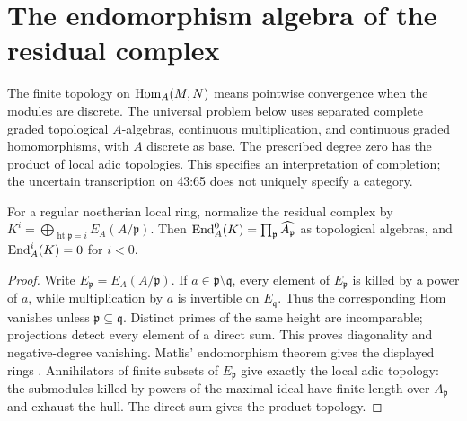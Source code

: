 \section{The endomorphism algebra of the residual complex}\label{sec:I}
The finite topology on $\operatorname{Hom}_A(M,N)$ means pointwise convergence
when the modules are discrete. The universal problem below uses
separated complete graded topological $A$-algebras, continuous
multiplication, and continuous graded homomorphisms, with $A$ discrete
as base. The prescribed degree zero has the product of local adic
topologies. This specifies an interpretation of completion; the
uncertain transcription on 43:65 does not uniquely specify a category.

\begin{proposition}\label{i:zero}
For a regular noetherian local ring, normalize the residual complex by
$K^i=\bigoplus_{\operatorname{ht}\mathfrak p=i}E_A(A/\mathfrak p)$.
Then $\operatorname{End}_A^0(K)=\prod_{\mathfrak p}\widehat{A_{\mathfrak p}}$
as topological algebras, and $\operatorname{End}_A^i(K)=0$ for $i<0$.
\end{proposition}
\begin{proof}
Write $E_{\mathfrak p}=E_A(A/\mathfrak p)$. If
$a\in\mathfrak p\setminus\mathfrak q$, every element of
$E_{\mathfrak p}$ is killed by a power of $a$, while multiplication
by $a$ is invertible on $E_{\mathfrak q}$. Thus the corresponding Hom
vanishes unless $\mathfrak p\subseteq\mathfrak q$. Distinct primes
of the same height are incomparable; projections detect every element
of a direct sum. This proves diagonality and negative-degree vanishing.
Matlis' endomorphism theorem gives the displayed rings
\cite[Lemma 2, proof, p.~123]{Sastry1992}. Annihilators of finite
subsets of $E_{\mathfrak p}$ give exactly the local adic topology:
the submodules killed by powers of the maximal ideal have finite
length over $A_{\mathfrak p}$ and exhaust the hull. The direct sum
gives the product topology.
\end{proof}

